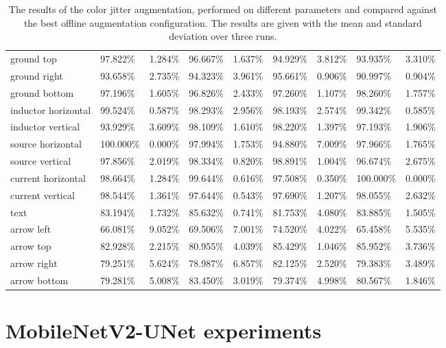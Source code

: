 \begin{table}[H]
\begin{center}
\begin{tabular}{|l|l|l|l|l|l|l|l|l|}
ground top                      & 97.822\%  & 1.284\% & 96.667\%  & 1.637\% & 94.929\% & 3.812\%  & 93.935\%  & 3.310\%   \\
\rowcolor{lightgray!50}
ground right                    & 93.658\%  & 2.735\% & 94.323\%  & 3.961\% & 95.661\% & 0.906\%  & 90.997\%  & 0.904\%   \\
ground bottom                   & 97.196\%  & 1.605\% & 96.826\%  & 2.433\% & 97.260\% & 1.107\%  & 98.260\%  & 1.757\%   \\
\rowcolor{lightgray!50}
inductor horizontal             & 99.524\%  & 0.587\% & 98.293\%  & 2.956\% & 98.193\% & 2.574\%  & 99.342\%  & 0.585\%   \\
inductor vertical               & 93.929\%  & 3.609\% & 98.109\%  & 1.610\% & 98.220\% & 1.397\%  & 97.193\%  & 1.906\%   \\
\rowcolor{lightgray!50}
source horizontal               & 100.000\% & 0.000\% & 97.994\%  & 1.753\% & 94.880\% & 7.009\%  & 97.966\%  & 1.765\%   \\
source vertical                 & 97.856\%  & 2.019\% & 98.334\%  & 0.820\% & 98.891\% & 1.004\%  & 96.674\%  & 2.675\%   \\
\rowcolor{lightgray!50}
current horizontal              & 98.664\%  & 1.284\% & 99.644\%  & 0.616\% & 97.508\% & 0.350\%  & 100.000\% & 0.000\%   \\
current vertical                & 98.544\%  & 1.361\% & 97.644\%  & 0.543\% & 97.690\% & 1.207\%  & 98.055\%  & 2.632\%   \\
\rowcolor{lightgray!50}
text                            & 83.194\%  & 1.732\% & 85.632\%  & 0.741\% & 81.753\% & 4.080\%  & 83.885\%  & 1.505\%   \\
arrow left                      & 66.081\%  & 9.052\% & 69.506\%  & 7.001\% & 74.520\% & 4.022\%  & 65.458\%  & 5.535\%   \\
\rowcolor{lightgray!50}
arrow top                       & 82.928\%  & 2.215\% & 80.955\%  & 4.039\% & 85.429\% & 1.046\%  & 85.952\%  & 3.736\%   \\
arrow right                     & 79.251\%  & 5.624\% & 78.987\%  & 6.857\% & 82.125\% & 2.520\%  & 79.383\%  & 3.489\%   \\
\rowcolor{lightgray!50}
arrow bottom                    & 79.281\%  & 5.008\% & 83.450\%  & 3.019\% & 79.374\% & 4.998\%  & 80.567\%  & 1.846\%   \\
\hline

\end{tabular}
\caption{The results of the color jitter augmentation, performed on different parameters and compared against the best offline augmentation configuration. The results are given with the mean and standard deviation over three runs.}
\label{tab:yolo_color_jitter_augmentation_result}
\end{center}
\end{table}

\section{MobileNetV2-UNet experiments}
